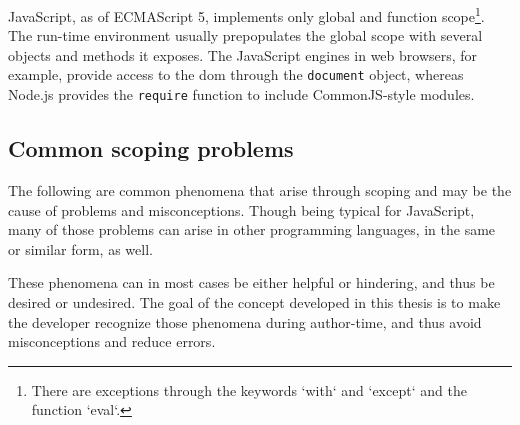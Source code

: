 JavaScript, as of ECMAScript 5, implements only global and function
scope\footnote{There are exceptions through the keywords `with` and `except` and the function `eval`.}.
The run-time environment usually prepopulates the global scope with
several objects and methods it exposes. The JavaScript engines in web
browsers, for example, provide access to the \ac{dom} through the
\texttt{document} object, whereas Node.js provides the \texttt{require}
function to include CommonJS-style modules.

\subsection{Common scoping problems}\label{common-scoping-problems}

The following are common phenomena that arise through scoping and may be
the cause of problems and misconceptions. Though being typical for
JavaScript, many of those problems can arise in other programming
languages, in the same or similar form, as well.

These phenomena can in most cases be either helpful or hindering, and
thus be desired or undesired. The goal of the concept developed in this
thesis is to make the developer recognize those phenomena during
author-time, and thus avoid misconceptions and reduce errors.


